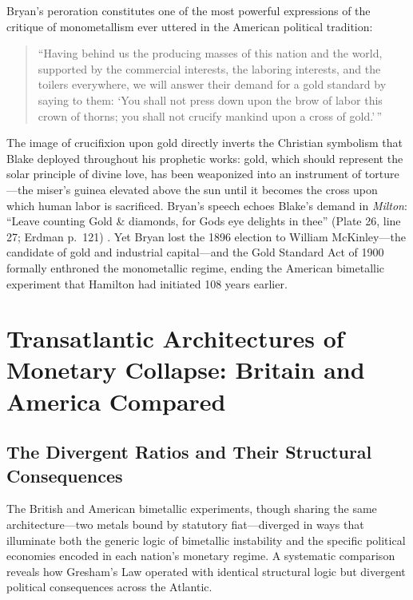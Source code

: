 \documentclass[
]{article}
\begin{document}
Bryan's peroration constitutes one of the most powerful expressions of
the critique of monometallism ever uttered in the American political
tradition:

\begin{quote}
``Having behind us the producing masses of this nation and the world,
supported by the commercial interests, the laboring interests, and the
toilers everywhere, we will answer their demand for a gold standard by
saying to them: `You shall not press down upon the brow of labor this
crown of thorns; you shall not crucify mankind upon a cross of
gold.'\,''
\end{quote}

The image of crucifixion upon gold directly inverts the Christian
symbolism that Blake deployed throughout his prophetic works: gold,
which should represent the solar principle of divine love, has been
weaponized into an instrument of torture---the miser's guinea elevated
above the sun until it becomes the cross upon which human labor is
sacrificed. Bryan's speech echoes Blake's demand in \emph{Milton}:
``Leave counting Gold \& diamonds, for Gods eye delights in thee''
(Plate 26, line 27; Erdman p.~121) \citep{erdman1988complete}. Yet Bryan
lost the 1896 election to William McKinley---the candidate of gold and
industrial capital---and the Gold Standard Act of 1900 formally
enthroned the monometallic regime, ending the American bimetallic
experiment that Hamilton had initiated 108 years earlier.

\newpage

\section{Transatlantic Architectures of Monetary Collapse: Britain and
America
Compared}\label{transatlantic-architectures-of-monetary-collapse-britain-and-america-compared}

\subsection{The Divergent Ratios and Their Structural
Consequences}\label{the-divergent-ratios-and-their-structural-consequences}

The British and American bimetallic experiments, though sharing the same
architecture---two metals bound by statutory fiat---diverged in ways
that illuminate both the generic logic of bimetallic instability and the
specific political economies encoded in each nation's monetary regime. A
systematic comparison reveals how Gresham's Law operated with identical
structural logic but divergent political consequences across the
Atlantic.
\end{document}
